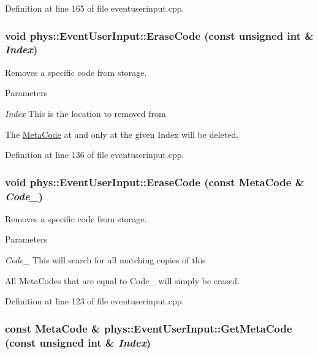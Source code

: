 Definition at line 165 of file eventuserinput.cpp.

\hypertarget{classphys_1_1EventUserInput_a583084578443019d6e286b8f0e02ce58}{
\subsubsection[{EraseCode}]{\setlength{\rightskip}{0pt plus 5cm}void phys::EventUserInput::EraseCode (const unsigned int \& {\em Index})}}
\label{d7/df5/classphys_1_1EventUserInput_a583084578443019d6e286b8f0e02ce58}


Removes a specific code from storage. 


\begin{DoxyParams}{Parameters}
\item[{\em Index}]This is the location to removed from\end{DoxyParams}
The \hyperlink{classphys_1_1MetaCode}{MetaCode} at and only at the given Index will be deleted. 

Definition at line 136 of file eventuserinput.cpp.

\hypertarget{classphys_1_1EventUserInput_a34c05a76a790435799441da75a83fa9c}{
\subsubsection[{EraseCode}]{\setlength{\rightskip}{0pt plus 5cm}void phys::EventUserInput::EraseCode (const {\bf MetaCode} \& {\em Code\_\-})}}
\label{d7/df5/classphys_1_1EventUserInput_a34c05a76a790435799441da75a83fa9c}


Removes a specific code from storage. 


\begin{DoxyParams}{Parameters}
\item[{\em Code\_\-}]This will search for all matching copies of this\end{DoxyParams}
All MetaCodes that are equal to Code\_\- will simply be erased. 

Definition at line 123 of file eventuserinput.cpp.

\hypertarget{classphys_1_1EventUserInput_a5f67c5ad4aa4edcce629955fd7d869ac}{
\subsubsection[{GetMetaCode}]{\setlength{\rightskip}{0pt plus 5cm}const {\bf MetaCode} \& phys::EventUserInput::GetMetaCode (const unsigned int \& {\em Index})}}
\label{d7/df5/classphys_1_1EventUserInput_a5f67c5ad4aa4edcce629955fd7d869ac}


